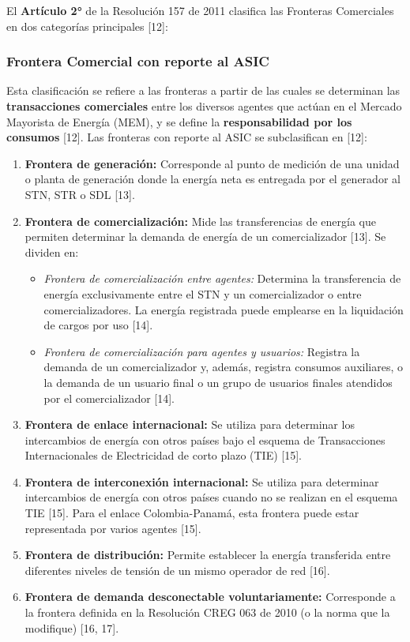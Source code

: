 \documentclass[a5paper]{book}%
\begin{document}
El \textbf{Artículo 2°} de la Resolución 157 de 2011 clasifica las Fronteras Comerciales en dos categorías principales [12]:

\subsubsection{Frontera Comercial con reporte al ASIC}

Esta clasificación se refiere a las fronteras a partir de las cuales se determinan las \textbf{transacciones comerciales} entre los diversos agentes que actúan en el Mercado Mayorista de Energía (MEM), y se define la \textbf{responsabilidad por los consumos} [12]. Las fronteras con reporte al ASIC se subclasifican en [12]:

\begin{enumerate}
	\item \textbf{Frontera de generación:} Corresponde al punto de medición de una unidad o planta de generación donde la energía neta es entregada por el generador al STN, STR o SDL [13].
	\item \textbf{Frontera de comercialización:} Mide las transferencias de energía que permiten determinar la demanda de energía de un comercializador [13]. Se dividen en:
	\begin{itemize}
		\item \textit{Frontera de comercialización entre agentes:} Determina la transferencia de energía exclusivamente entre el STN y un comercializador o entre comercializadores. La energía registrada puede emplearse en la liquidación de cargos por uso [14].
		\item \textit{Frontera de comercialización para agentes y usuarios:} Registra la demanda de un comercializador y, además, registra consumos auxiliares, o la demanda de un usuario final o un grupo de usuarios finales atendidos por el comercializador [14].
	\end{itemize}
	\item \textbf{Frontera de enlace internacional:} Se utiliza para determinar los intercambios de energía con otros países bajo el esquema de Transacciones Internacionales de Electricidad de corto plazo (TIE) [15].
	\item \textbf{Frontera de interconexión internacional:} Se utiliza para determinar intercambios de energía con otros países cuando no se realizan en el esquema TIE [15]. Para el enlace Colombia-Panamá, esta frontera puede estar representada por varios agentes [15].
	\item \textbf{Frontera de distribución:} Permite establecer la energía transferida entre diferentes niveles de tensión de un mismo operador de red [16].
	\item \textbf{Frontera de demanda desconectable voluntariamente:} Corresponde a la frontera definida en la Resolución CREG 063 de 2010 (o la norma que la modifique) [16, 17].
\end{enumerate}
\end{document}

